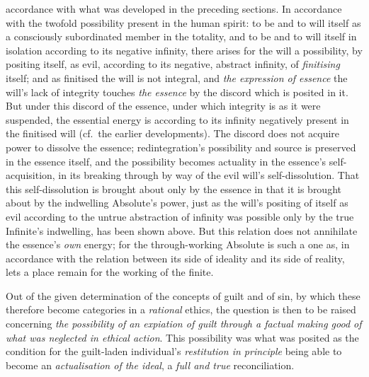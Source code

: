 \documentclass[12pt,a4paper]{book}
\begin{document}
accordance with what was developed in the preceding sections. In accordance with
the twofold possibility present in the human spirit: to be and to will itself as
a consciously subordinated member in the totality, and to be and to will itself
in isolation according to its negative infinity,
there arises for the will a possibility, by positing itself, as evil, according
to its negative, abstract infinity, of \emph{finitising} itself; and as
finitised the will is not integral, and \emph{the expression of essence} the
will's lack of integrity touches \emph{the essence} by the discord which is
posited in it. But under this discord of the essence, under which integrity is
as it were suspended, the essential energy is according to its infinity
negatively present in the finitised will (cf.\ the earlier developments). The
discord does not acquire power to dissolve the essence; redintegration's
possibility and source is preserved in the essence itself, and the possibility
becomes actuality in the essence's self-acquisition, in its breaking through by
way of the evil will's self-dissolution. That this self-dissolution is brought
about only by the essence in that it is brought about by the indwelling
Absolute's power, just as the will's positing of itself as evil according to the
untrue abstraction of infinity was possible only by the true Infinite's
indwelling, has been shown above. But this relation does not annihilate the
essence's \emph{own} energy; for the through-working Absolute is such a one as,
in accordance with the relation between its side of ideality and its side of
reality, lets a place remain for the working of the finite.

Out of the given determination of the concepts of guilt and of sin, by which
these therefore become categories in a \emph{rational} ethics, the question is
then to be raised concerning \emph{the possibility of an expiation of guilt
through a factual making good of what was neglected in ethical action}. This
possibility was what was posited as the condition for the guilt-laden
individual's \emph{restitution in principle} being able to become an
\emph{actualisation of the ideal}, a \emph{full and true} reconciliation.
\end{document}
